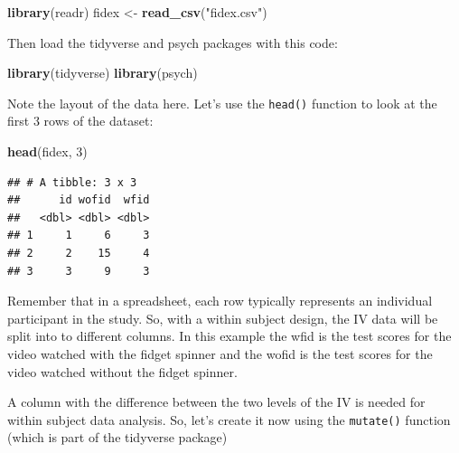 \documentclass[
]{book}
\newenvironment{Shaded}{\begin{snugshade}}{\end{snugshade}}
\newcommand{\DataTypeTok}[1]{\textcolor[rgb]{0.13,0.29,0.53}{#1}}
\newcommand{\DecValTok}[1]{\textcolor[rgb]{0.00,0.00,0.81}{#1}}
\newcommand{\KeywordTok}[1]{\textcolor[rgb]{0.13,0.29,0.53}{\textbf{#1}}}
\newcommand{\NormalTok}[1]{#1}
\newcommand{\OperatorTok}[1]{\textcolor[rgb]{0.81,0.36,0.00}{\textbf{#1}}}
\newcommand{\StringTok}[1]{\textcolor[rgb]{0.31,0.60,0.02}{#1}}
\begin{document}
\begin{Shaded}
\begin{Highlighting}[]
\KeywordTok{library}\NormalTok{(readr)}
\NormalTok{fidex <-}\StringTok{ }\KeywordTok{read_csv}\NormalTok{(}\StringTok{"fidex.csv"}\NormalTok{)}
\end{Highlighting}
\end{Shaded}

Then load the tidyverse and psych packages with this code:

\begin{Shaded}
\begin{Highlighting}[]
\KeywordTok{library}\NormalTok{(tidyverse)}
\KeywordTok{library}\NormalTok{(psych)}
\end{Highlighting}
\end{Shaded}

Note the layout of the data here. Let's use the \texttt{head()} function to look at the first 3 rows of the dataset:

\begin{Shaded}
\begin{Highlighting}[]
\KeywordTok{head}\NormalTok{(fidex, }\DecValTok{3}\NormalTok{)}
\end{Highlighting}
\end{Shaded}

\begin{verbatim}
## # A tibble: 3 x 3
##      id wofid  wfid
##   <dbl> <dbl> <dbl>
## 1     1     6     3
## 2     2    15     4
## 3     3     9     3
\end{verbatim}

Remember that in a spreadsheet, each row typically represents an individual participant in the study. So, with a within subject design, the IV data will be split into to different columns. In this example the wfid is the test scores for the video watched with the fidget spinner and the wofid is the test scores for the video watched without the fidget spinner.

A column with the difference between the two levels of the IV is needed for within subject data analysis. So, let's create it now using the \texttt{mutate()} function (which is part of the tidyverse package)

\begin{Shaded}
\end{Shaded}
\end{document}
